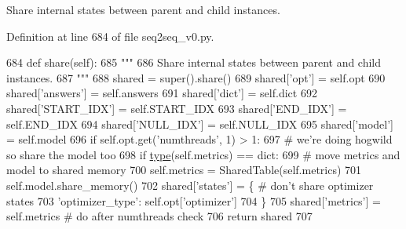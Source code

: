 \begin{DoxyVerb}Share internal states between parent and child instances.
\end{DoxyVerb}
 

Definition at line 684 of file seq2seq\+\_\+v0.\+py.


\begin{DoxyCode}
684     \textcolor{keyword}{def }share(self):
685         \textcolor{stringliteral}{"""}
686 \textcolor{stringliteral}{        Share internal states between parent and child instances.}
687 \textcolor{stringliteral}{        """}
688         shared = super().share()
689         shared[\textcolor{stringliteral}{'opt'}] = self.opt
690         shared[\textcolor{stringliteral}{'answers'}] = self.answers
691         shared[\textcolor{stringliteral}{'dict'}] = self.dict
692         shared[\textcolor{stringliteral}{'START\_IDX'}] = self.START\_IDX
693         shared[\textcolor{stringliteral}{'END\_IDX'}] = self.END\_IDX
694         shared[\textcolor{stringliteral}{'NULL\_IDX'}] = self.NULL\_IDX
695         shared[\textcolor{stringliteral}{'model'}] = self.model
696         \textcolor{keywordflow}{if} self.opt.get(\textcolor{stringliteral}{'numthreads'}, 1) > 1:
697             \textcolor{comment}{# we're doing hogwild so share the model too}
698             \textcolor{keywordflow}{if} \hyperlink{namespaceparlai_1_1agents_1_1tfidf__retriever_1_1build__tfidf_ad5dfae268e23f506da084a9efb72f619}{type}(self.metrics) == dict:
699                 \textcolor{comment}{# move metrics and model to shared memory}
700                 self.metrics = SharedTable(self.metrics)
701                 self.model.share\_memory()
702             shared[\textcolor{stringliteral}{'states'}] = \{  \textcolor{comment}{# don't share optimizer states}
703                 \textcolor{stringliteral}{'optimizer\_type'}: self.opt[\textcolor{stringliteral}{'optimizer'}]
704             \}
705         shared[\textcolor{stringliteral}{'metrics'}] = self.metrics  \textcolor{comment}{# do after numthreads check}
706         \textcolor{keywordflow}{return} shared
707 
\end{DoxyCode}
\mbox{\label{classparlai_1_1agents_1_1legacy__agents_1_1seq2seq_1_1seq2seq__v0_1_1Seq2seqAgent_a86c41e705170f0b2e56a5bbc378aead9}} 
